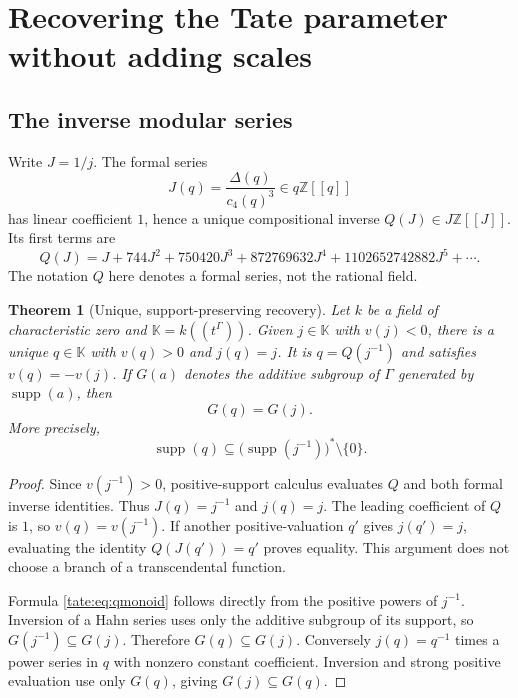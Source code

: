 \documentclass[11pt,letterpaper]{article}
\newtheorem{theorem}{Theorem}[section]
\theoremstyle{definition}
\newcommand{\Z}{\mathbb Z}
\newcommand{\supp}{\operatorname{supp}}
\newcommand{\KK}{\mathbb K}
\begin{document}
\section{Recovering the Tate parameter without adding scales}\label{tate:sec:j}

\subsection{The inverse modular series}

Write $J=1/j$. The formal series
\[
 J(q)=\frac{\Delta(q)}{c_4(q)^3}\in q\Z[[q]]
\]
has linear coefficient $1$, hence a unique compositional inverse
$Q(J)\in J\Z[[J]]$. Its first terms are
\begin{equation}
 Q(J)=J+744J^2+750420J^3+872769632J^4
       +1102652742882J^5+\cdots.\label{tate:eq:qJ}
\end{equation}
The notation $Q$ here denotes a formal series, not the rational field.

\begin{theorem}[Unique, support-preserving recovery]\label{tate:thm:recover}
Let $k$ be a field of characteristic zero and $\KK=k((t^\Gamma))$.
Given $j\in\KK$ with $v(j)<0$, there is a unique $q\in\KK$
with $v(q)>0$ and $j(q)=j$. It is $q=Q(j^{-1})$ and satisfies
$v(q)=-v(j)$. If $G(a)$ denotes the additive subgroup of $\Gamma$
generated by $\supp(a)$, then
\begin{equation}
 G(q)=G(j).\label{tate:eq:supportgroup}
\end{equation}
More precisely,
\begin{equation}
 \supp(q)\subseteq
 \bigl(\supp(j^{-1})\bigr)^*\setminus\{0\}.\label{tate:eq:qmonoid}
\end{equation}
\end{theorem}

\begin{proof}
Since $v(j^{-1})>0$, positive-support calculus evaluates $Q$ and both
formal inverse identities. Thus $J(q)=j^{-1}$ and $j(q)=j$.
The leading coefficient of $Q$ is $1$, so $v(q)=v(j^{-1})$.
If another positive-valuation $q'$ gives $j(q')=j$, evaluating the
identity $Q(J(q'))=q'$ proves equality. This argument does not choose
a branch of a transcendental function.

Formula \eqref{tate:eq:qmonoid} follows directly from the positive powers of
$j^{-1}$. Inversion of a Hahn series uses only the additive subgroup of
its support, so $G(j^{-1})\subseteq G(j)$. Therefore $G(q)\subseteq G(j)$.
Conversely $j(q)=q^{-1}$ times a power series in $q$ with nonzero
constant coefficient. Inversion and strong positive evaluation use only
$G(q)$, giving $G(j)\subseteq G(q)$.
\end{proof}
\end{document}
